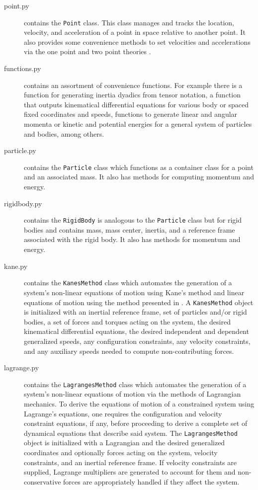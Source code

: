 \documentclass[twocolumn,10pt, final]{asme2e}
\begin{document}
\begin{description}
\begin{description}
    \end{description}
  \item[point.py] contains the \verb|Point| class. This class manages
    and tracks the location, velocity, and acceleration of a point in space
    relative to another point. It also provides some convenience methods to set
    velocities and accelerations via the one point and two point theories
    \cite{Kane1985}.
  \item[functions.py] contains an assortment of convenience functions. For
    example there is a function for generating inertia dyadics from tensor
    notation, a function that outputs kinematical differential equations for
    various body or spaced fixed coordinates and speeds, functions to generate
    linear and angular momenta or kinetic and potential energies for a general
    system of particles and bodies, among others.
  \item[particle.py] contains the \verb|Particle| class which functions as a
    container class for a point and an associated mass. It also has methods for
    computing momentum and energy.
  \item[rigidbody.py] contains the \verb|RigidBody| is analogous to the
    \verb|Particle| class but for rigid bodies and contains mass, mass center,
    inertia, and a reference frame associated with the rigid body. It also has
    methods for momentum and energy.
  \item[kane.py] contains the \verb|KanesMethod| class which automates the
    generation of a system's non-linear equations of motion using Kane's
    method\cite{Kane1985} and linear equations of motion using the method
    presented in \cite{Peterson2013}. A \verb|KanesMethod| object is initialized
    with an inertial reference frame, set of particles and/or rigid bodies, a
    set of forces and torques acting on the system, the desired kinematical
    differential equations, the desired independent and dependent generalized
    speeds, any configuration constraints, any velocity constraints, and any
    auxiliary speeds needed to compute non-contributing forces.
  \item[lagrange.py] contains the \verb|LagrangesMethod| class which automates
    the generation of a system's non-linear equations of motion via the methods
    of Lagrangian mechanics\cite{Crandall1968}. To derive the equations of
    motion of a constrained system using Lagrange's equations, one requires the
    configuration and velocity constraint equations, if any, before proceeding
    to derive a complete set of dynamical equations that describe said system.
    The \verb|LagrangesMethod| object is initialized with a Lagrangian and the
    desired generalized coordinates and optionally forces acting on the system,
    velocity constraints, and an inertial reference frame. If velocity
    constraints are supplied, Lagrange multipliers are generated to account for
    them and non-conservative forces are appropriately handled if they affect
    the system.
\end{description}
\end{document}
